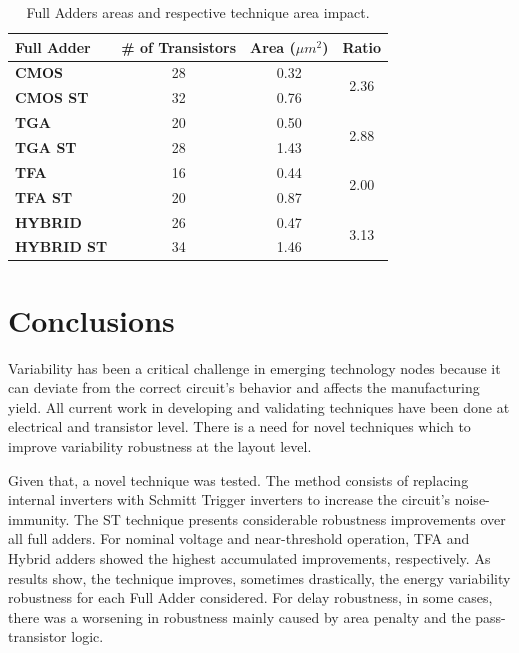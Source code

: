\documentclass[ecp,tc, english]{iiufrgs}
\begin{document}
\begin{table}[H]
\centering
\caption{Full Adders areas and respective technique area impact.}
\label{penalties}
\begin{tabular}{lccc}
\hline
\textbf{Full Adder} & \multicolumn{1}{l}{\textbf{\# of Transistors}} & \textbf{Area (${\mu m}^2$)} & \textbf{Ratio}        \\ \hline
\textbf{CMOS}       & 28                                              & 0.32             & \multirow{2}{*}{2.36} \\ \cline{1-3}
\textbf{CMOS ST}    & 32                                              & 0.76             &                       \\ \hline
\textbf{TGA}        & 20                                              & 0.50             & \multirow{2}{*}{2.88} \\ \cline{1-3}
\textbf{TGA ST}     & 28                                              & 1.43             &                       \\ \hline
\textbf{TFA}        & 16                                              & 0.44             & \multirow{2}{*}{2.00} \\ \cline{1-3}
\textbf{TFA ST}     & 20                                              & 0.87             &                       \\ \hline
\textbf{HYBRID}     & 26                                              & 0.47             & \multirow{2}{*}{3.13} \\ \cline{1-3}
\textbf{HYBRID ST}  & 34                                              & 1.46             &                       \\ \hline
\end{tabular}
\end{table}



\chapter{Conclusions}

Variability has been a critical challenge in emerging technology nodes because it can deviate from the correct circuit's behavior and affects the manufacturing yield. All current work in developing and validating techniques have been done at electrical and transistor level. There is a need for novel techniques which to improve variability robustness at the layout level.

Given that, a novel technique was tested. The method consists of replacing internal inverters with Schmitt Trigger inverters to increase the circuit’s noise-immunity. The ST technique presents considerable robustness improvements over all full adders. For nominal voltage and near-threshold operation, TFA and Hybrid adders showed the highest accumulated improvements, respectively. As results show, the technique improves, sometimes drastically, the energy variability robustness for each Full Adder considered. For delay robustness, in some cases, there was a worsening in robustness mainly caused by area penalty and the pass-transistor logic. 
\end{document}
